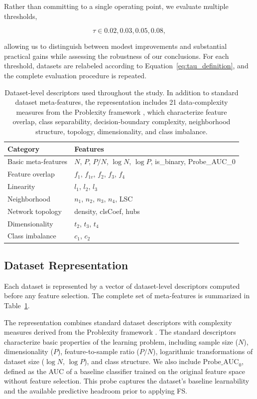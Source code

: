 \documentclass[preprint,12pt,authoryear]{elsarticle}
\begin{document}
Rather than committing to a single operating point, we evaluate multiple thresholds,

\begin{equation}
\tau \in {0.02, 0.03, 0.05, 0.08},
\end{equation}

allowing us to distinguish between modest improvements and substantial practical gains while assessing the robustness of our conclusions. For each threshold, datasets are relabeled according to Equation~\eqref{eq:tau_definition}, and the complete evaluation procedure is repeated.


\begin{table}[htbp]
\centering
\caption{Dataset-level descriptors used throughout the study. In addition to standard dataset meta-features, the representation includes 21 data-complexity measures from the Problexity framework \citep{Komorniczak2023Problexity}, which characterize feature overlap, class separability, decision-boundary complexity, neighborhood structure, topology, dimensionality, and class imbalance.}\label{tab:metafeatures}
\begin{tabular}{ll}
\toprule
Category & Features \\
\midrule
Basic meta-features &
$N$, $P$, $P/N$, $\log N$, $\log P$, is\_binary, Probe\_AUC\_0 \\
Feature overlap &
$f_1$, $f_{1v}$, $f_2$, $f_3$, $f_4$ \\
Linearity &
$l_1$, $l_2$, $l_3$ \\
Neighborhood &
$n_1$, $n_2$, $n_3$, $n_4$, LSC \\
Network topology &
density, clsCoef, hubs \\
Dimensionality &
$t_2$, $t_3$, $t_4$ \\
Class imbalance &
$c_1$, $c_2$ \\
\bottomrule
\end{tabular}
\end{table}

\subsection{Dataset Representation}
\label{sec:dataset_representation}

Each dataset is represented by a vector of dataset-level descriptors computed before any feature selection. The complete set of meta-features is summarized in Table~\ref{tab:metafeatures}.

The representation combines standard dataset descriptors with complexity measures derived from the Problexity framework \citep{Komorniczak2023Problexity}. The standard descriptors characterize basic properties of the learning problem, including sample size ($N$), dimensionality ($P$), feature-to-sample ratio ($P/N$), logarithmic transformations of dataset size ($\log N$, $\log P$), and class structure. We also include $\mathrm{Probe\_AUC}_0$, defined as the AUC of a baseline classifier trained on the original feature space without feature selection. This probe captures the dataset's baseline learnability and the available predictive headroom prior to applying FS.
\end{document}
